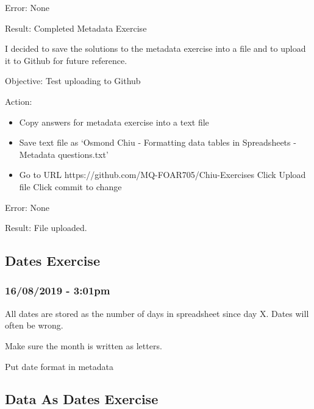 \documentclass{article}
\begin{document}
Error: None\par
Result: Completed Metadata Exercise\par
I decided to save the solutions to the metadata exercise into a file and to upload it to Github for future reference.\par
Objective: Test uploading to Github\par
Action:\par
\begin{itemize}
\item Copy answers for metadata exercise into a text file
\item Save text file as ‘Osmond Chiu - Formatting data tables in Spreadsheets - Metadata questions.txt’
\item Go to URL https://github.com/MQ-FOAR705/Chiu-Exercises
Click Upload file
Click commit to change
\end{itemize}
Error: None\par
Result: File uploaded.
\subsection{Dates Exercise}
\subsubsection*{16/08/2019 - 3:01pm}
All dates are stored as the number of days in spreadsheet since day X. Dates will often be wrong.\par
Make sure the month is written as letters.\par
Put date format in metadata\par
\subsection{Data As Dates Exercise}
\end{document}
